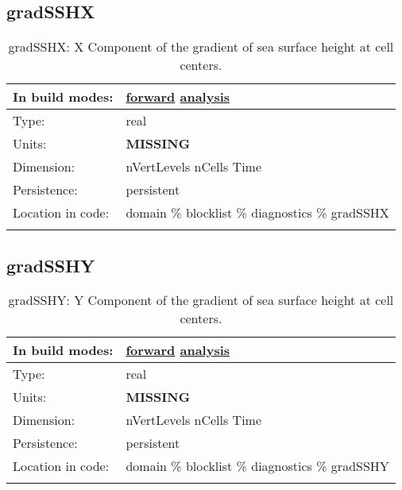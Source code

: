 \subsection[gradSSHX]{gradSSHX}
\label{subsec:var_sec_diagnostics_gradSSHX}
\begin{center}
\begin{longtable}{| p{2.0in} | p{4.0in} |}
        \hline 
        In build modes: & \hyperref[subsec:forward_var_tab_diagnostics]{forward} \hyperref[subsec:analysis_var_tab_diagnostics]{analysis} \\
        \hline 
        Type: & real \\
        \hline 
        Units: & {\bf \color{red} MISSING} \\
        \hline 
        Dimension: & nVertLevels nCells Time \\
        \hline 
        Persistence: & persistent \\
        \hline 
		 Location in code: & domain \% blocklist \% diagnostics \% gradSSHX \\
		 \hline 
    \caption{gradSSHX: X Component of the gradient of sea surface height at cell centers.}
\end{longtable}
\end{center}
\subsection[gradSSHY]{gradSSHY}
\label{subsec:var_sec_diagnostics_gradSSHY}
\begin{center}
\begin{longtable}{| p{2.0in} | p{4.0in} |}
        \hline 
        In build modes: & \hyperref[subsec:forward_var_tab_diagnostics]{forward} \hyperref[subsec:analysis_var_tab_diagnostics]{analysis} \\
        \hline 
        Type: & real \\
        \hline 
        Units: & {\bf \color{red} MISSING} \\
        \hline 
        Dimension: & nVertLevels nCells Time \\
        \hline 
        Persistence: & persistent \\
        \hline 
		 Location in code: & domain \% blocklist \% diagnostics \% gradSSHY \\
		 \hline 
    \caption{gradSSHY: Y Component of the gradient of sea surface height at cell centers.}
\end{longtable}
\end{center}
